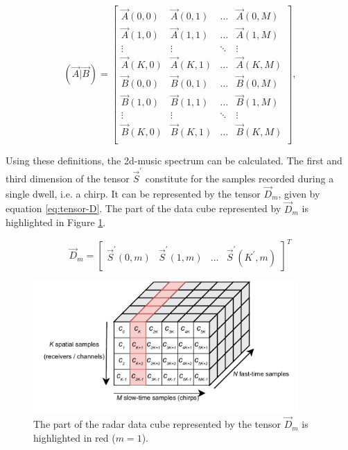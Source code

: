 \begin{equation}
\label{eq:tensor-augmentation}
    (\vec{A} | \vec{B}) =
    \begin{bmatrix}
        \vec{A}(0, 0) & \vec{A}(0, 1) & \ldots & \vec{A}(0, M) \\
        \vec{A}(1, 0) & \vec{A}(1, 1) & \ldots & \vec{A}(1, M) \\
        \vdots        & \vdots        & \ddots & \vdots        \\
        \vec{A}(K, 0) & \vec{A}(K, 1) & \ldots & \vec{A}(K, M) \\
        \vec{B}(0, 0) & \vec{B}(0, 1) & \ldots & \vec{B}(0, M) \\
        \vec{B}(1, 0) & \vec{B}(1, 1) & \ldots & \vec{B}(1, M) \\
        \vdots        & \vdots        & \ddots & \vdots        \\
        \vec{B}(K, 0) & \vec{B}(K, 1) & \ldots & \vec{B}(K, M) \\
    \end{bmatrix},
\end{equation}

Using these definitions, the \gls{2d-music} spectrum can be calculated.
The first and third dimension of the tensor $\vec{S}^{\prime}$ constitute for the samples recorded during a single dwell,
i.e. a chirp. It can be represented by the tensor $\vec{D}_m$, given by equation \ref{eq:tensor-D}.
The part of the data cube represented by $\vec{D}_m$ is highlighted in Figure \ref{fig:tensor-D}.

\begin{equation}
\label{eq:tensor-D}
    \vec{D}_m = \begin{bmatrix} \vec{S}^{\prime}(0, m) & \vec{S}^{\prime}(1, m) & \ldots & \vec{S}^{\prime}(K^{\prime}, m)  \end{bmatrix} ^T
\end{equation}

\begin{figure}[H]
    \centering
    \includegraphics[width=0.9\textwidth]{fig/4/radar-cube-tensor-D.pdf}
    \caption{The part of the radar data cube represented by the tensor $\vec{D}_m$ is highlighted in red ($m = 1$).}
    \label{fig:tensor-D}
\end{figure}


